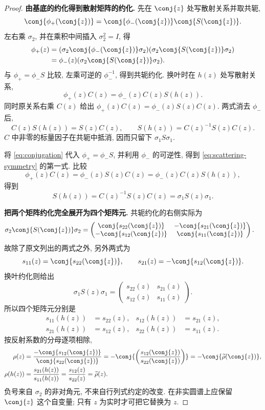 \begin{proof}

\par\medskip\noindent\textbf{由基底的约化得到散射矩阵的约化.}\quad 
先在 $\conj{z}$ 处写散射关系并取共轭,
\[
\conj{\phi_+(\conj{z})}
=\conj{\phi_-(\conj{z})}\conj{S(\conj{z})}.
\]
左右乘 $\sigma_2$, 并在乘积中间插入
$\sigma_2^2=I$, 得
\begin{align*}
\phi_+(z)
&=(\sigma_2\conj{\phi_-(\conj{z})}\sigma_2)
(\sigma_2\conj{S(\conj{z})}\sigma_2)\\
&=\phi_-(z)(\sigma_2\conj{S(\conj{z})}\sigma_2).
\end{align*}
与 $\phi_+=\phi_-S$ 比较, 左乘可逆的 $\phi_-^{-1}$,
得到共轭约化.
换叶时在 $h(z)$ 处写散射关系,
\[
\phi_+(z)C(z)=\phi_-(z)C(z)S(h(z)).
\]
同时原关系右乘 $C(z)$ 给出
$\phi_+(z)C(z)=\phi_-(z)S(z)C(z)$.
两式消去 $\phi_-$ 后,
\[
C(z)S(h(z))=S(z)C(z),
\qquad
S(h(z))=C(z)^{-1}S(z)C(z).
\]
$C$ 中非零的标量因子在共轭中抵消, 因而只留下
$\sigma_1S\sigma_1$.

将 \eqref{eq:conjugation} 代入 $\phi_+=\phi_-S$, 并利用 $\phi_-$ 的可逆性, 得到 \eqref{eq:scattering-symmetry} 的第一式. 比较
\[
\phi_+(z)C(z)=\phi_-(z)S(z)C(z)
=\phi_-(z)C(z)S(h(z)),
\]
得到
\[
S(h(z))=C(z)^{-1}S(z)C(z)=\sigma_1S(z)\sigma_1.
\]

\par\medskip\noindent\textbf{把两个矩阵约化完全展开为四个矩阵元.}\quad 
共轭约化的右侧实际为
\begin{align*}
\sigma_2\conj{S(\conj{z})}\sigma_2
&=\begin{pmatrix}
\conj{s_{22}(\conj{z})}&-\conj{s_{21}(\conj{z})}\\
-\conj{s_{12}(\conj{z})}&\conj{s_{11}(\conj{z})}
\end{pmatrix}.
\end{align*}
故除了原文列出的两式之外, 另外两式为
\[
s_{11}(z)=\conj{s_{22}(\conj{z})},
\qquad
s_{21}(z)=-\conj{s_{12}(\conj{z})}.
\]
换叶约化则给出
\[
\sigma_1S(z)\sigma_1
=\begin{pmatrix}s_{22}(z)&s_{21}(z)\\s_{12}(z)&s_{11}(z)\end{pmatrix}.
\]
所以四个矩阵元分别是
\begin{align*}
s_{11}(h(z))&=s_{22}(z),&s_{12}(h(z))&=s_{21}(z),\\
s_{21}(h(z))&=s_{12}(z),&s_{22}(h(z))&=s_{11}(z).
\end{align*}
按反射系数的分母逐项相除,
\begin{align*}
\rho(z)
&=\dfrac{-\conj{s_{12}(\conj{z})}}{\conj{s_{22}(\conj{z})}}
=-\conj{\left(\dfrac{s_{12}(\conj{z})}{s_{22}(\conj{z})}\right)}
=-\conj{\widetilde\rho(\conj{z})},\\
\rho(h(z))
&=\dfrac{s_{21}(h(z))}{s_{11}(h(z))}
=\dfrac{s_{12}(z)}{s_{22}(z)}=\widetilde\rho(z).
\end{align*}
负号来自 $\sigma_2$ 的非对角元, 不来自行列式约定的改变.
在非实圆谱上应保留 $\conj{z}$ 这个自变量;
只有 $z$ 为实时才可把它替换为 $z$.


\end{proof}
